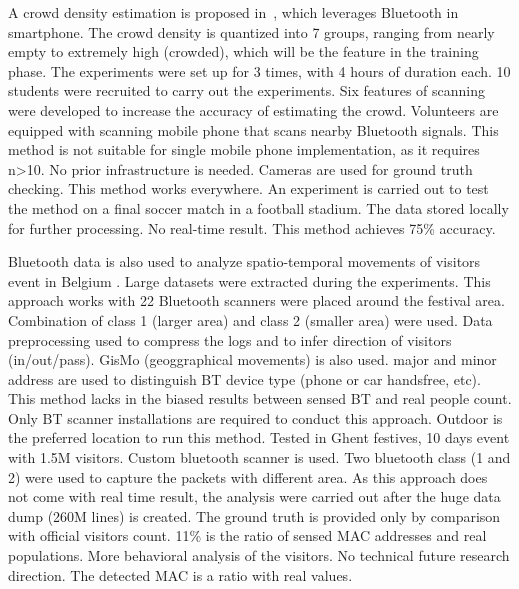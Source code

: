 A crowd density estimation is proposed in~\cite{thesis008}, which leverages Bluetooth in smartphone. The crowd density is quantized into 7 groups, ranging from nearly empty to extremely high (crowded), which will be the feature in the training phase. The experiments were set up for 3 times, with 4 hours of duration each. 10 students were recruited to carry out the experiments. Six features of scanning were developed to increase the accuracy of estimating the crowd. Volunteers are equipped with scanning mobile phone that scans nearby Bluetooth signals. This method is not suitable for single mobile phone implementation, as it requires n>10. No prior infrastructure is needed. Cameras are used for ground truth checking. This method works everywhere. An experiment is carried out to test the method on a final soccer match in a football stadium. The data stored locally for further processing. No real-time result. This method achieves 75\% accuracy.

Bluetooth data is also used to analyze spatio-temporal movements of visitors event in Belgium \cite{thesis016}. Large datasets were extracted during the experiments. This approach works with 22 Bluetooth scanners were placed around the festival area. Combination of class 1 (larger area) and class 2 (smaller area) were used. Data preprocessing used to compress the logs and to infer direction of visitors (in/out/pass). GisMo (geoggraphical movements) is also used. major and minor address are used to distinguish BT device type (phone or car handsfree, etc). This method lacks in the biased results between sensed BT and real people count. Only BT scanner installations are required to conduct this approach. Outdoor is the preferred location to run this method. Tested in Ghent festives, 10 days event with 1.5M visitors. Custom bluetooth scanner is used. Two bluetooth class (1 and 2) were used to capture the packets with different area. As this approach does not come with real time result, the analysis were carried out after the huge data dump (260M lines) is created. The ground truth is provided only by comparison with official visitors count. 11\% is the ratio of sensed MAC addresses and real populations. More behavioral analysis of the visitors. No technical future research direction.
The detected MAC is a ratio with real values.

